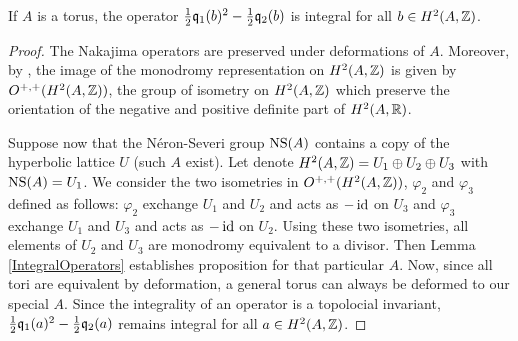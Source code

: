 \begin{corollary} \label{IntegralOperatorsTorus}
If $A$ is a torus, the operator $\frac{1}{2}\mathfrak{q}_1(b)^2 - \frac{1}{2}\mathfrak{q}_2(b)$ is integral for all $b\in H^2(A,\mathbb{Z})$. 
\end{corollary}
\begin{proof}
The Nakajima operators are preserved under deformations of $A$. 
Moreover, by %
\cite{Borcea}, 
the image of the monodromy representation on $H^2(A,\mathbb{Z})$ is given by $O^{+,+}(H^2(A,\mathbb{Z}))$, the group of isometry on $H^2(A,\mathbb{Z})$ which preserve the orientation of the negative and positive definite part of $H^2(A,\mathbb{R})$.


Suppose now that the N\'eron-Severi group $\operatorname{NS}(A)$ contains a copy of the hyperbolic lattice $U$ (such $A$ exist).
Let denote $H^2(A,\mathbb{Z})=U_1\oplus U_2\oplus U_3$ with $\operatorname{NS}(A)=U_1$.
We consider the two isometries in $O^{+,+}(H^2(A,\mathbb{Z}))$, $\varphi_2$ and $\varphi_3$ defined as follows:
$\varphi_2$ exchange $U_1$ and $U_2$ and acts as $-\operatorname{id}$ on $U_3$ and $\varphi_3$ exchange $U_1$ and $U_3$ and acts as $-\operatorname{id}$ on $U_2$.
Using these two isometries, all elements of $U_2$ and $U_3$ are monodromy equivalent to a divisor.
Then Lemma \ref{IntegralOperators} establishes proposition for that particular $A$. 
Now, since all tori are equivalent by deformation, a general torus can always be deformed to our special $A$. Since the integrality of an operator is a topolocial invariant, $\frac{1}{2}\mathfrak{q}_1(a)^2 - \frac{1}{2}\mathfrak{q}_2(a)$ remains integral for all $a\in H^2(A,\mathbb{Z})$.
\end{proof}

